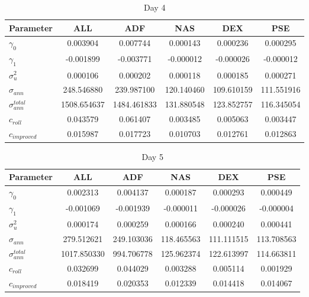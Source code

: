 \documentclass{article}
\begin{document}
\begin{table}[H]
\begin{adjustbox}{width=\textwidth}
\begin{tabular}{lccccc}
\toprule
\textbf{Parameter} & \textbf{ALL} & \textbf{ADF} & \textbf{NAS} & \textbf{DEX} & \textbf{PSE} \\
\midrule
\texttt{$\gamma_0$}       & 0.003904  & 0.007744  & 0.000143  & 0.000236  & 0.000295  \\
\texttt{$\gamma_1$}       & -0.001899 & -0.003771 & -0.000012 & -0.000026 & -0.000012 \\
\texttt{$\sigma^2_u$}        & 0.000106  & 0.000202  & 0.000118  & 0.000185  & 0.000271  \\
\texttt{$\sigma_{ann}$}      & 248.546880 & 239.987100 & 120.140460 & 109.610159 & 111.551916 \\
\texttt{$\sigma_{ann}^{total}$}& 1508.654637 & 1484.461833 & 131.880548 & 123.852757 & 116.345054 \\
\texttt{$c_{roll}$}      & 0.043579 &	0.061407 &	0.003485 &	0.005063 &	0.003447  \\
\texttt{$c_{improved}$}      & 0.015987  & 0.017723  & 0.010703  & 0.012761  & 0.012863  \\
\bottomrule
\end{tabular}
\end{adjustbox}
\caption{Day 4}
\label{tab:day4_parameters}
\end{table}

\begin{table}[H]
\begin{adjustbox}{width=\textwidth}
\begin{tabular}{lccccc}
\toprule
\textbf{Parameter} & \textbf{ALL} & \textbf{ADF} & \textbf{NAS} & \textbf{DEX} & \textbf{PSE} \\
\midrule
\texttt{$\gamma_0$}       & 0.002313  & 0.004137  & 0.000187  & 0.000293  & 0.000449  \\
\texttt{$\gamma_1$}       & -0.001069 & -0.001939 & -0.000011 & -0.000026 & -0.000004 \\
\texttt{$\sigma^2_u$}        & 0.000174  & 0.000259  & 0.000166  & 0.000240  & 0.000441  \\
\texttt{$\sigma_{ann}$}      & 279.512621 & 249.103036 & 118.465563 & 111.111515 & 113.708563 \\
\texttt{$\sigma_{ann}^{total}$}& 1017.850330 & 994.706778 & 125.962374 & 122.613997 & 114.663811 \\
\texttt{$c_{roll}$}      & 0.032699 &	0.044029 &	0.003288 &	0.005114 &	0.001929  \\
\texttt{$c_{improved}$}      & 0.018419  & 0.020353  & 0.012339  & 0.014418  & 0.014067  \\
\bottomrule
\end{tabular}
\end{adjustbox}
\caption{Day 5}
\label{tab:day5_parameters}
\end{table}
\end{document}
